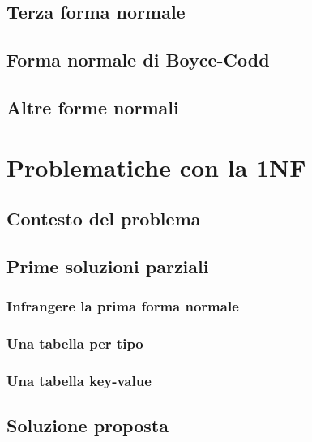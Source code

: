 \documentclass[10pt,twoside,cucitura]{toptesi}
\begin{document}
\section{Terza forma normale}


\section{Forma normale di Boyce-Codd}


\section{Altre forme normali}


\chapter{Problematiche con la 1NF}

\section{Contesto del problema}


\section{Prime soluzioni parziali}


\subsection{Infrangere la prima forma normale}


\subsection{Una tabella per tipo}
\subsection{Una tabella key-value}

\section{Soluzione proposta}
\label{sec:soluzione}

\cleardoublepage
{}
{}
\printbibliography
\end{document}
